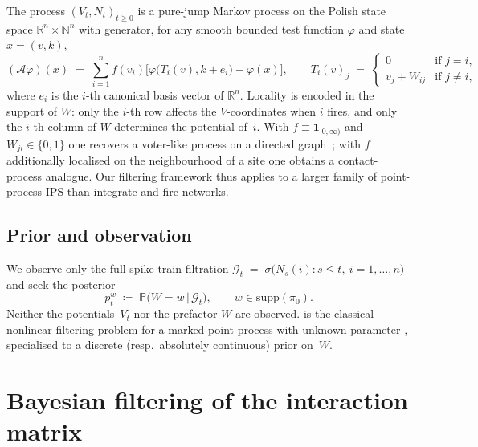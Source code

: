 \documentclass[11pt,a4paper]{article}
\theoremstyle{definition}
\newcommand{\R}{\mathbb{R}}
\newcommand{\N}{\mathbb{N}}
\newcommand{\Prob}{\mathbb{P}}
\newcommand{\Ind}{\mathbf{1}}
\newcommand{\cG}{\mathcal{G}}
\begin{document}
The process $(V_t, N_t)_{t \geq 0}$ is a pure-jump Markov process on
the Polish state space $\R^n \times \N^n$ with generator, for any
smooth bounded test function $\varphi$ and state $x = (v, k)$,
\begin{equation}
    (\mathcal{A} \varphi)(x) \;=\; \sum_{i=1}^n f(v_i) \bigl[
        \varphi\bigl( T_i(v), k + e_i \bigr) - \varphi(x)
    \bigr],
    \qquad
    T_i(v)_j \;=\; \begin{cases}
        0 & \text{if } j = i, \\
        v_j + W_{i j} & \text{if } j \neq i,
    \end{cases}
    \label{eq:generator}
\end{equation}
where $e_i$ is the $i$-th canonical basis vector of $\R^n$. Locality
is encoded in the support of $W$: only the $i$-th row affects the
$V$-coordinates when $i$ fires, and only the $i$-th column of $W$
determines the potential of~$i$. With $f \equiv \Ind_{[0, \infty)}$
and $W_{j i} \in \{0, 1\}$ one recovers a voter-like process on a
directed graph~\citep{Liggett2005}; with $f$ additionally localised on
the neighbourhood of a site one obtains a contact-process analogue.
Our filtering framework thus applies to a larger family of
point-process IPS than integrate-and-fire networks.

\subsection{Prior and observation}
\label{subsec:prior_obs}

We observe only the full spike-train filtration
$\cG_t \;=\; \sigma\bigl( N_s(i) : s \leq t,\ i = 1, \ldots, n \bigr)$
and seek the posterior
\begin{equation}
    p_t^w \;\coloneqq\; \Prob\bigl( W = w \,\big|\, \cG_t \bigr),
    \qquad w \in \mathrm{supp}(\pi_0).
    \label{eq:posterior_def}
\end{equation}
Neither the potentials~$V_t$ nor the prefactor $W$ are observed.
 is the classical nonlinear filtering problem
for a marked point process with unknown parameter
\citep{Bremaud1981,Snyder1972,Kallianpur1980}, specialised to a
discrete (resp.\ absolutely continuous) prior on~$W$.

\section{Bayesian filtering of the interaction matrix}
\label{sec:filtering}
\end{document}
